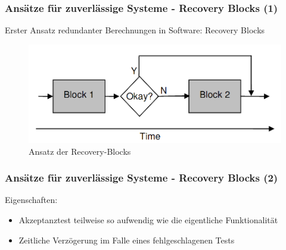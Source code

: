 \begin{frame}
	\frametitle{Ansätze für zuverlässige Systeme - Recovery Blocks (1)}
	Erster Ansatz redundanter Berechnungen in Software: Recovery Blocks \cite{Horning:1974:PSE:647641.733522}
	\begin{figure}
		\includegraphics[scale=0.3]{grafiken/recovery-block.png}		
		\caption{Ansatz der Recovery-Blocks
			\footnotemark		
		}		
	\end{figure}
\end{frame}
%
%
\begin{frame}
	\frametitle{Ansätze für zuverlässige Systeme - Recovery Blocks (2)}
	Eigenschaften:
	\begin{itemize}
		\item Akzeptanztest teilweise so aufwendig wie die eigentliche Funktionalität 
		\item Zeitliche Verzögerung im Falle eines fehlgeschlagenen Tests
	\end{itemize}	
\end{frame}